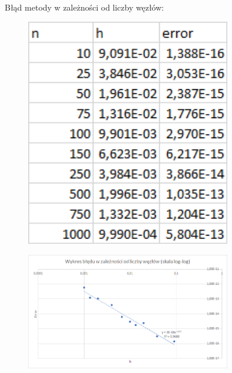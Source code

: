 \newpage

\begin{samepage}
    Błąd metody w zależności od liczby węzłów:
    \begin{figure}[!ht]
        \begin{center}
            \includegraphics[width=0.8\textwidth]{Lab4/charts/zad3/error_dane.png}
        \end{center}
    \end{figure}
    \FloatBarrier
\end{samepage} 

\begin{samepage}
	\begin{figure}[!ht]
		\begin{center}
			\includegraphics[width=0.8\textwidth]{Lab4/charts/zad3/error.png}
		\end{center}
	\end{figure}
	\FloatBarrier
\end{samepage} 

